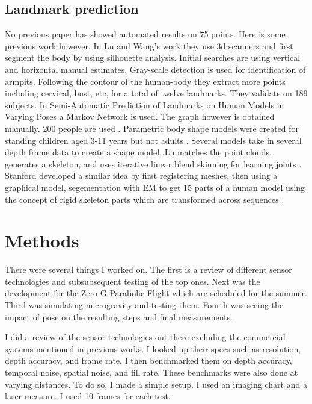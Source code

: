 \section{Landmark prediction}
No previous paper has showed automated results on 75 points. Here is some previous work however. In Lu and Wang's work \cite{lu2008automated} they use 3d scanners and first segment the body by using silhouette analysis. Initial searches are using vertical and horizontal manual estimates. Gray-scale detection is used for identification of armpits. Following the contour of the human-body they extract more points including cervical, bust, etc, for a total of twelve landmarks. They validate on 189 subjects. In Semi-Automatic Prediction of Landmarks on Human Models in Varying Poses a Markov Network is used. The graph however is obtained manually. 200 people are used \cite{wuhrer2010semi}. Parametric body shape models were created for standing children aged 3-11 years but not adults \cite{park2015parametric}. Several models take in several depth frame data to create a shape model \cite{deng2019neural}.Lu matches the point clouds, generates a skeleton, and uses iterative linear blend skinning for learning joints \cite{lu20193d}. Stanford developed a similar idea by first registering meshes, then using a graphical model, segementation with EM to get 15 parts of a human model using the concept of rigid skeleton parts which are transformed across sequences \cite{anguelov2012recovering}.


\chapter{Methods}
There were several things I worked on. The first is a review of different sensor technologies and subsubsequent testing of the top ones. Next was the development for the Zero G Parabolic Flight which are scheduled for the summer. Third was simulating microgravity and testing them. Fourth was seeing the impact of pose on the resulting steps and final measurements.

I did a review of the sensor technologies out there excluding the commercial systems mentioned in previous works. I looked up their specs such as resolution, depth accuracy, and frame rate. I then benchmarked them on depth accuracy, temporal noise, spatial noise, and fill rate. These benchmarks were also done at varying distances. To do so, I made a simple setup. I used an imaging chart and a laser measure. I used 10 frames for each test.

